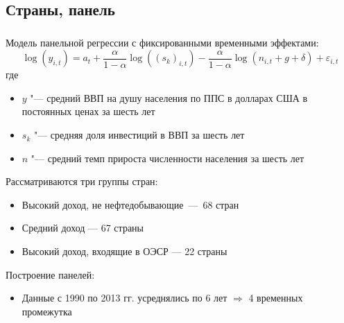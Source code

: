 \documentclass[c, dvipsnames]{beamer}  %
\begin{document}
\subsection{Страны, панель}



\begin{frame}[shrink=12]
\frametitle{\insertsection} 
\framesubtitle{\insertsubsection}
Модель панельной регрессии с фиксированными временными эффектами: 
\begin{equation} 
\log(y_{i,t})=a_t+\frac{\alpha}{1-\alpha}\log((s_k)_{i,t})-\frac{\alpha}{1-\alpha}\log(n_{i,t}+g+\delta)+\varepsilon_{i,t}
\end{equation}
где 
\begin{itemize}
\item $y$ "--- средний ВВП на душу населения по ППС  в долларах США в постоянных ценах  за шесть лет
\item $s_k$ "--- средняя доля инвестиций в  ВВП  за шесть лет
\item $n$ "--- средний темп прироста  численности населения  за шесть лет
\end{itemize}
Рассматриваются три группы стран:
\begin{itemize}
\item Высокий доход, не нефтедобывающие~---~68 стран 
\item Средний доход --- 67 страны
\item Высокий доход, входящие в ОЭСР --- 22 страны
\end{itemize}
Построение панелей:
\begin{itemize}
	\item Данные с 1990 по 2013 гг. усреднялись по 6 лет $\Rightarrow$ 4 временных промежутка 
\end{itemize}

\end{frame}
\end{document}
